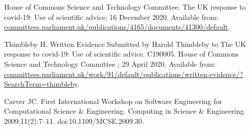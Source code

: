 \documentclass[10pt,letterpaper]{article}
\begin{document}
{\begin{thebibliography}{10}
{House of Commons Science and Technology Committee}. The {UK} response to
  covid-19: {Use} of scientific advice; 16 December 2020.
\newblock Available from:
  \url{committees.parliament.uk/publications/4165/documents/41300/default}.

Thimbleby H.
\newblock Written Evidence Submitted by {Harold Thimbleby} to The {UK} response
  to covid-19: {Use} of scientific advice.
\newblock C190005. {House of Commons Science and Technology Committee}
  {\cite{parliamentary-evidence}}; 29 April 2020.
\newblock Available from:
  \url{committees.parliament.uk/work/91/default/publications/written-evidence/?SearchTerm=thimbleby}.

Carver JC.
\newblock First International Workshop on Software Engineering for
  Computational Science {\&} Engineering.
\newblock Computing in Science {\&} Engineering. 2009;11(2):7--11.
\newblock doi:{10.1109/MCSE.2009.30}.

\end{thebibliography}



%
%
}
\end{document}
